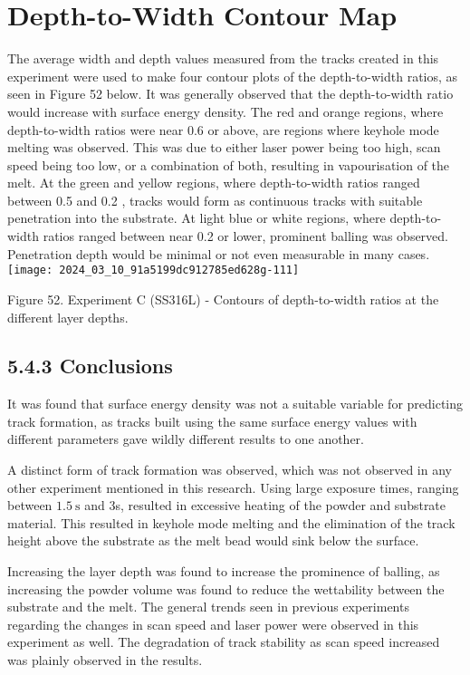 \documentclass[10pt]{article}
\begin{document}
\section*{Depth-to-Width Contour Map}
The average width and depth values measured from the tracks created in this experiment were used to make four contour plots of the depth-to-width ratios, as seen in Figure 52 below. It was generally observed that the depth-to-width ratio would increase with surface energy density. The red and orange regions, where depth-to-width ratios were near 0.6 or above, are regions where keyhole mode melting was observed. This was due to either laser power being too high, scan speed being too low, or a combination of both, resulting in vapourisation of the melt. At the green and yellow regions, where depth-to-width ratios ranged between 0.5 and 0.2 , tracks would form as continuous tracks with suitable penetration into the substrate. At light blue or white regions, where depth-to-width ratios ranged between near 0.2 or lower, prominent balling was observed. Penetration depth would be minimal or not even measurable in many cases.\\
\texttt{[image: 2024\_03\_10\_91a5199dc912785ed628g-111]}

Figure 52. Experiment C (SS316L) - Contours of depth-to-width ratios at the different layer depths.

\subsection*{5.4.3 Conclusions}
It was found that surface energy density was not a suitable variable for predicting track formation, as tracks built using the same surface energy values with different parameters gave wildly different results to one another.

A distinct form of track formation was observed, which was not observed in any other experiment mentioned in this research. Using large exposure times, ranging between $1.5 \mathrm{~s}$ and 3s, resulted in excessive heating of the powder and substrate material. This resulted in keyhole mode melting and the elimination of the track height above the substrate as the melt bead would sink below the surface.

Increasing the layer depth was found to increase the prominence of balling, as increasing the powder volume was found to reduce the wettability between the substrate and the melt. The general trends seen in previous experiments regarding the changes in scan speed and laser power were observed in this experiment as well. The degradation of track stability as scan speed increased was plainly observed in the results.
\end{document}
